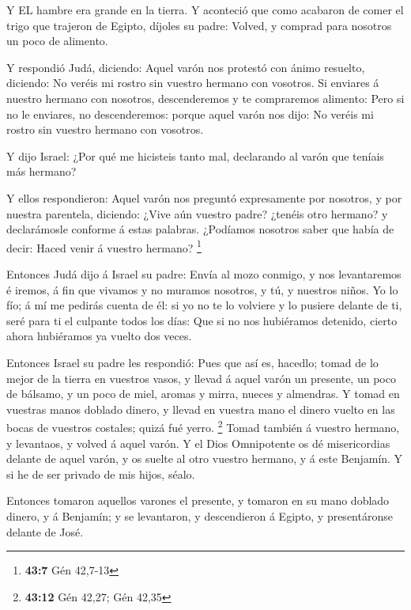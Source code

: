  Y EL hambre era grande en la tierra.  Y
aconteció que como acabaron de comer el trigo que trajeron de Egipto,
díjoles su padre: Volved, y comprad para nosotros un poco de alimento.

 Y respondió Judá, diciendo: Aquel varón nos protestó con
ánimo resuelto, diciendo: No veréis mi rostro sin vuestro hermano con
vosotros.  Si enviares á nuestro hermano con nosotros,
descenderemos y te compraremos alimento:  Pero si no le
enviares, no descenderemos: porque aquel varón nos dijo: No veréis mi
rostro sin vuestro hermano con vosotros.

 Y dijo Israel: ¿Por qué me hicisteis tanto mal, declarando
al varón que teníais más hermano?

 Y ellos respondieron: Aquel varón nos preguntó expresamente
por nosotros, y por nuestra parentela, diciendo: ¿Vive aún vuestro
padre? ¿tenéis otro hermano? y declarámosle conforme á estas palabras.
¿Podíamos nosotros saber que había de decir: Haced venir á vuestro
hermano? \footnote{\textbf{43:7} Gén 42,7-13}

 Entonces Judá dijo á Israel su padre: Envía al mozo
conmigo, y nos levantaremos é iremos, á fin que vivamos y no muramos
nosotros, y tú, y nuestros niños.  Yo lo fío; á mí me
pedirás cuenta de él: si yo no te lo volviere y lo pusiere delante de
ti, seré para ti el culpante todos los días:  Que si no nos
hubiéramos detenido, cierto ahora hubiéramos ya vuelto dos veces.

 Entonces Israel su padre les respondió: Pues que así es,
hacedlo; tomad de lo mejor de la tierra en vuestros vasos, y llevad á
aquel varón un presente, un poco de bálsamo, y un poco de miel, aromas y
mirra, nueces y almendras.  Y tomad en vuestras manos
doblado dinero, y llevad en vuestra mano el dinero vuelto en las bocas
de vuestros costales; quizá fué yerro. \footnote{\textbf{43:12} Gén
  42,27; Gén 42,35}  Tomad también á vuestro hermano, y
levantaos, y volved á aquel varón.  Y el Dios Omnipotente
os dé misericordias delante de aquel varón, y os suelte al otro vuestro
hermano, y á este Benjamín. Y si he de ser privado de mis hijos, séalo.

 Entonces tomaron aquellos varones el presente, y tomaron
en su mano doblado dinero, y á Benjamín; y se levantaron, y descendieron
á Egipto, y presentáronse delante de José.

